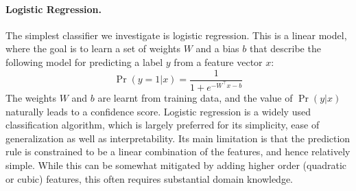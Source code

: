 \paragraph{Logistic Regression.} The simplest classifier we investigate is logistic regression. This is a linear model, where the goal is to learn a set of weights $W$ and a bias $b$ that describe the following model for predicting a label $y$ from a feature vector $x$:
\[ \Pr(y = 1 | x) = \frac{1}{1 + e^{-W^{\top} x - b}} \]
The weights $W$ and $b$ are learnt from training data, and the value of $\Pr(y | x)$ naturally leads to a confidence score. Logistic regression is a widely used classification algorithm, which is largely preferred for its simplicity, ease of generalization as well as interpretability. Its main limitation is that the prediction rule is constrained to be a linear combination of the features, and hence relatively simple. While this can be somewhat mitigated by adding higher order (quadratic or cubic) features, this often requires substantial domain knowledge.



%
%

